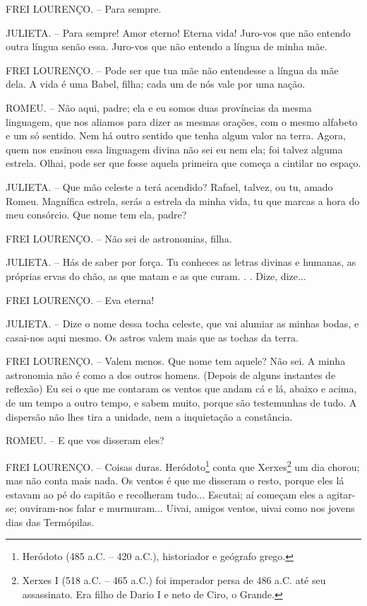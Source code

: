 FREI LOURENÇO. -- Para sempre.

JULIETA. -- Para sempre! Amor eterno! Eterna vida! Juro-vos que não
entendo outra língua senão essa. Juro-vos que não entendo a língua de
minha mãe.

FREI LOURENÇO. -- Pode ser que tua mãe não entendesse a língua da mãe
dela. A vida é uma Babel, filha; cada um de nós vale por uma nação.

ROMEU. -- Não aqui, padre; ela e eu somos duas províncias da mesma
linguagem, que nos aliamos para dizer as mesmas orações, com o mesmo
alfabeto e um só sentido. Nem há outro sentido que tenha algum valor na
terra. Agora, quem nos ensinou essa linguagem divina não sei eu nem ela;
foi talvez alguma estrela. Olhai, pode ser que fosse aquela primeira que
começa a cintilar no espaço.

JULIETA. -- Que mão celeste a terá acendido? Rafael, talvez, ou tu,
amado Romeu. Magnífica estrela, serás a estrela da minha vida, tu que
marcas a hora do meu consórcio. Que nome tem ela, padre?

FREI LOURENÇO. -- Não sei de astronomias, filha.

JULIETA. -- Hás de saber por força. Tu conheces as letras divinas e
humanas, as próprias ervas do chão, as que matam e as que curam. . .
Dize, dize...

FREI LOURENÇO. -- Eva eterna!

JULIETA. -- Dize o nome dessa tocha celeste, que vai alumiar as minhas
bodas, e casai-nos aqui mesmo. Os astros valem mais que as tochas da
terra.

FREI LOURENÇO. -- Valem menos. Que nome tem aquele? Não sei. A minha
astronomia não é como a dos outros homens. (Depois de alguns instantes
de reflexão) Eu sei o que me contaram os ventos que andam cá e lá,
abaixo e acima, de um tempo a outro tempo, e sabem muito, porque são
testemunhas de tudo. A dispersão não lhes tira a unidade, nem a
inquietação a constância.

ROMEU. -- E que vos disseram eles?

FREI LOURENÇO. -- Coisas duras. Heródoto\footnote{Heródoto (485 a.C. --
  420 a.C.), historiador e geógrafo grego.} conta que Xerxes\footnote{Xerxes
  I (518 a.C. -- 465 a.C.) foi imperador persa de 486 a.C. até seu
  assassinato. Era filho de Dario I e neto de Ciro, o Grande.} um dia
chorou; mas não conta mais nada. Os ventos é que me disseram o resto,
porque eles lá estavam ao pé do capitão e recolheram tudo... Escutai; aí
começam eles a agitar-se; ouviram-nos falar e murmuram... Uivai, amigos
ventos, uivai como nos jovens dias das Termópilas.

